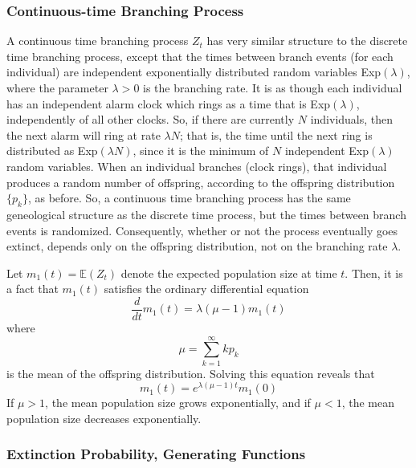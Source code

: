   \subsubsection{Continuous-time Branching Process}

    A continuous time branching process $Z_t$ has very similar structure to the discrete time branching process, except that the times between branch events (for each individual) are independent exponentially distributed random variables Exp$(\lambda)$, where the parameter $\lambda> 0$ is the branching rate. It is as though each individual has an independent alarm clock which rings as a time that is Exp$(\lambda)$, independently of all other clocks. So, if there are currently $N$ individuals, then the next alarm will ring at rate $\lambda N$; that is, the time until the next ring is distributed as Exp$(\lambda N)$, since it is the minimum of $N$ independent Exp$(\lambda)$ random variables. When an individual branches (clock rings), that individual produces a random number of offspring, according to the offspring distribution $\{p_k\}$, as before. So, a continuous time branching process has the same geneological structure as the discrete time process, but the times between branch events is randomized. Consequently, whether or not the process eventually goes extinct, depends only on the offspring distribution, not on the branching rate $\lambda$. 

    Let $m_1(t) = \mathbb{E}(Z_t)$ denote the expected population size at time $t$. Then, it is a fact that $m_1(t)$ satisfies the ordinary differential equation
    \begin{equation}
      \frac{d}{d t} m_1 (t) = \lambda(\mu - 1) m_1 (t)
    \end{equation}
    where 
    \begin{equation}
      \mu = \sum_{k=1}^\infty k p_k
    \end{equation}
    is the mean of the offspring distribution. Solving this equation reveals that 
    \begin{equation}
      m_1 (t) = e^{\lambda (\mu-1) t} m_1 (0)
    \end{equation}
    If $\mu > 1$, the mean population size grows exponentially, and if $\mu < 1$, the mean population size decreases exponentially. 

  \subsubsection{Extinction Probability, Generating Functions}

